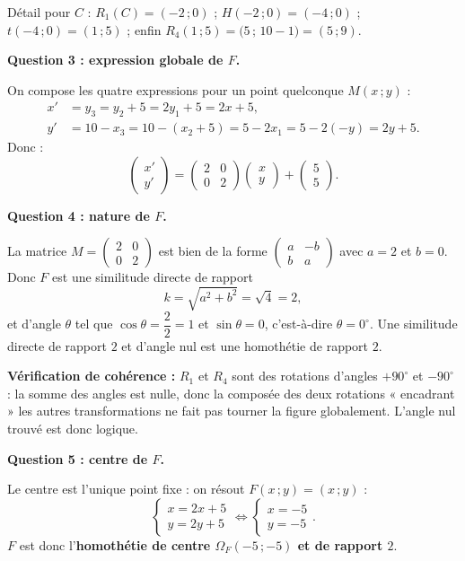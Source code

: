 \documentclass[11pt]{article}
\newcommand{\cle}[1]{{\popxbold\color{popdark}#1}}
\begin{document}
\begin{exoresolu}
Détail pour $C$ : $R_1(C) = (-2\,;0)$ ; $H(-2\,;0) = (-4\,;0)$ ; $t(-4\,;0) = (1\,;5)$ ; enfin $R_4(1\,;5) = \bigl(5\,;\,10-1\bigr) = (5\,;9)$.

\textbf{Question 3 : expression globale de $F$.}

On compose les quatre expressions pour un point quelconque $M(x\,;y)$ :
\begin{align*}
x' &= y_3 = y_2 + 5 = 2y_1 + 5 = 2x + 5, \\
y' &= 10 - x_3 = 10 - (x_2 + 5) = 5 - 2x_1 = 5 - 2(-y) = 2y + 5.
\end{align*}
Donc :
\[ \begin{pmatrix} x' \\ y' \end{pmatrix} = \begin{pmatrix} 2 & 0 \\ 0 & 2 \end{pmatrix}\begin{pmatrix} x \\ y \end{pmatrix} + \begin{pmatrix} 5 \\ 5 \end{pmatrix}. \]

\textbf{Question 4 : nature de $F$.}

La matrice $M = \begin{pmatrix} 2 & 0 \\ 0 & 2 \end{pmatrix}$ est bien de la forme $\begin{pmatrix} a & -b \\ b & a \end{pmatrix}$ avec $a = 2$ et $b = 0$. Donc $F$ est une \cle{similitude directe} de rapport
\[ k = \sqrt{a^2 + b^2} = \sqrt{4} = 2, \]
et d'angle $\theta$ tel que $\cos\theta = \dfrac{2}{2} = 1$ et $\sin\theta = 0$, c'est-à-dire $\theta = 0^\circ$. Une similitude directe de rapport $2$ et d'angle nul est une \cle{homothétie} de rapport $2$.

\textbf{Vérification de cohérence :} $R_1$ et $R_4$ sont des rotations d'angles $+90^\circ$ et $-90^\circ$ : la somme des angles est nulle, donc la composée des deux rotations « encadrant » les autres transformations ne fait pas tourner la figure globalement. L'angle nul trouvé est donc logique.

\textbf{Question 5 : centre de $F$.}

Le centre est l'unique point fixe : on résout $F(x\,;y) = (x\,;y)$ :
\[ \begin{cases} x = 2x + 5 \\ y = 2y + 5 \end{cases} \iff \begin{cases} x = -5 \\ y = -5 \end{cases}. \]
$F$ est donc l'\textbf{homothétie de centre $\Omega_F(-5\,;-5)$ et de rapport $2$}.


\end{exoresolu}
\end{document}
